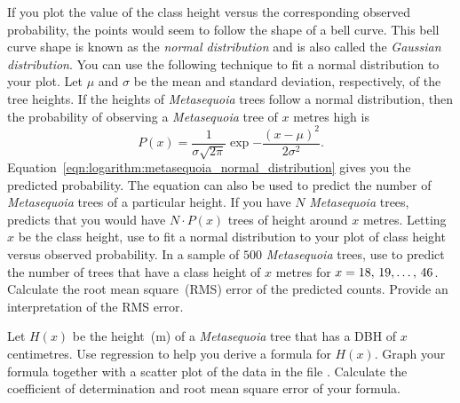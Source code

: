 \documentclass[a4paper,oneside,12pt]{article}
\begin{document}
\begin{problem}
\begin{packedenum}
  \item\label{subprob:logistic:metasequoia_height_normal_plot}
    If you plot the value of the class height versus the corresponding
    observed probability, the points would seem to follow the shape of
    a bell curve.  This bell curve shape is known as the
    \emph{normal distribution} and is also called the
    \emph{Gaussian distribution}.  You can use the following technique
    to fit a normal distribution to your plot.  Let $\mu$ and $\sigma$
    be the mean and standard deviation, respectively, of the tree
    heights.  If the heights of \emph{Metasequoia} trees follow a
    normal distribution, then the probability of observing a
    \emph{Metasequoia} tree of $x$ metres high is
    \begin{equation}
    \label{eqn:logarithm:metasequoia_normal_distribution}
    P(x)
    =
    \frac{1}{\sigma \sqrt{2 \pi}}
    \exp{
      -
      \frac{
        (x - \mu)^2
      }{
        2 \sigma^2
      }
    }.
    \end{equation}
    Equation~\eqref{eqn:logarithm:metasequoia_normal_distribution}
    gives you the predicted probability.  The equation can also be
    used to predict the number of \emph{Metasequoia} trees of a
    particular height.  If you have $N$ \emph{Metasequoia} trees,
     predicts
    that you would have $N \cdot P(x)$ trees of height around $x$
    metres.   Letting $x$ be the class height, use
     to fit a
    normal distribution to your plot of class height versus observed
    probability.  In a sample of $500$ \emph{Metasequoia} trees, use
     to
    predict the number of trees that have a class height of $x$
    metres for $x = {18},\, {19}, \dots,\, {46}$.  Calculate the root mean
    square~(RMS) error of the predicted counts.  Provide an
    interpretation of the RMS error.

  \item\label{subprob:logistic:metasequoia_formula}
    Let $H(x)$ be the height~(m) of a \emph{Metasequoia} tree that has
    a DBH of $x$ centimetres.  Use regression to help you derive a
    formula for $H(x)$.  Graph your formula together with a scatter
    plot of the data in the file .  Calculate
    the coefficient of determination and root mean square error of
    your formula.
  \end{packedenum}
\end{problem}
\end{document}
